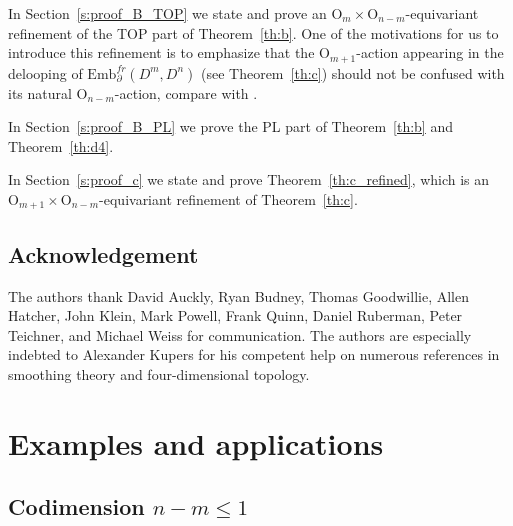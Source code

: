 \documentclass[11pt]{amsart}
\theoremstyle{definition}
\newcommand{\Emb}{\mathrm{Emb}}
\newcommand{\OO}{\mathrm{O}}
\numberwithin{equation}{section}
\begin{document}
In Section~\ref{s:proof_B_TOP} we state and prove an $\OO_m\times\OO_{n-m}$-equivariant refinement of the TOP part of Theorem~\ref{th:b}. One of the motivations for us to introduce this
refinement is to emphasize that the $\OO_{m+1}$-action appearing in the delooping of $\Emb_\partial^{fr}(D^m,D^{n})$ (see Theorem~\ref{th:c})   should not be confused with its natural $\OO_{n-m}$-action, compare with 
\cite[Corollary~1.2]{Sakai}.

In Section~\ref{s:proof_B_PL} %
  we prove the PL part of Theorem~\ref{th:b} and Theorem~\ref{th:d4}. 

In Section~\ref{s:proof_c} we state and prove Theorem~\ref{th:c_refined}, which is an $\OO_{m+1}\times\OO_{n-m}$-equivariant refinement of Theorem~\ref{th:c}.


\subsection{Acknowledgement}\label{ss:ackn}
The authors thank David Auckly, Ryan Budney, Thomas Goodwillie, Allen Hatcher, John Klein, Mark Powell, Frank Quinn, Daniel Ruberman, Peter Teichner, and Michael Weiss for communication. 
The authors are especially indebted to Alexander Kupers for his competent help on numerous references in  smoothing theory and four-dimensional topology. 



\section{Examples and applications}\label{s:examples}



\subsection{Codimension $n-m\leq 1$}\label{ss:cod1}
\end{document}
